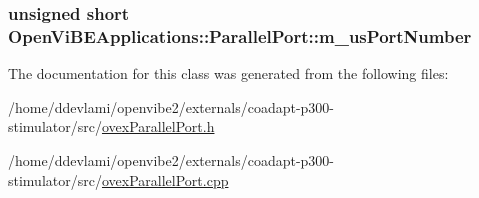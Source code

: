 \label{classOpenViBEApplications_1_1ParallelPort_a7a1f4b171c0d5151349eeddab4e0f985}
\hypertarget{classOpenViBEApplications_1_1ParallelPort_a6c20f6f312e776a44a9bad7ca32354ab}{
\subsubsection[{m\_\-usPortNumber}]{\setlength{\rightskip}{0pt plus 5cm}unsigned short {\bf OpenViBEApplications::ParallelPort::m\_\-usPortNumber}}}
\label{classOpenViBEApplications_1_1ParallelPort_a6c20f6f312e776a44a9bad7ca32354ab}


The documentation for this class was generated from the following files:\begin{DoxyCompactItemize}
\item 
/home/ddevlami/openvibe2/externals/coadapt-\/p300-\/stimulator/src/\hyperlink{ovexParallelPort_8h}{ovexParallelPort.h}\item 
/home/ddevlami/openvibe2/externals/coadapt-\/p300-\/stimulator/src/\hyperlink{ovexParallelPort_8cpp}{ovexParallelPort.cpp}\end{DoxyCompactItemize}

